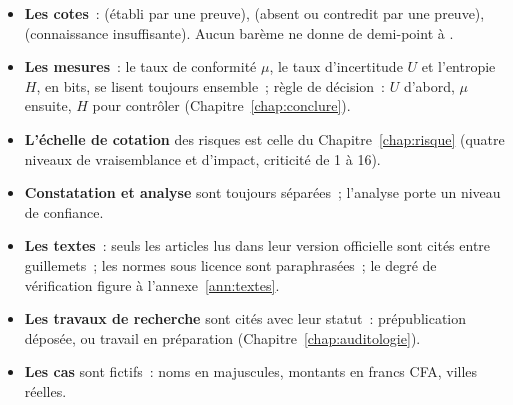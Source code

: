 \begin{itemize}
    \item \textbf{Les cotes}~: \OUI{} (établi par une preuve), \NON{}
          (absent ou contredit par une preuve), \NEK{} (connaissance
          insuffisante). Aucun barème ne donne de demi-point à \NEK{}.
    \item \textbf{Les mesures}~: le taux de conformité $\mu$, le taux
          d'incertitude $U$ et l'entropie $H$, en bits, se lisent toujours
          ensemble~; règle de décision~: $U$ d'abord, $\mu$ ensuite, $H$ pour
          contrôler (Chapitre~\ref{chap:conclure}).
    \item \textbf{L'échelle de cotation} des risques est celle du
          Chapitre~\ref{chap:risque} (quatre niveaux de vraisemblance et
          d'impact, criticité de 1 à 16).
    \item \textbf{Constatation et analyse} sont toujours séparées~; l'analyse
          porte un niveau de confiance.
    \item \textbf{Les textes}~: seuls les articles lus dans leur version
          officielle sont cités entre guillemets~; les normes sous licence
          sont paraphrasées~; le degré de vérification figure à
          l'annexe~\ref{ann:textes}.
    \item \textbf{Les travaux de recherche} sont cités avec leur statut~:
          prépublication déposée, ou travail en préparation
          (Chapitre~\ref{chap:auditologie}).
    \item \textbf{Les cas} sont fictifs~: noms en majuscules, montants en
          francs CFA, villes réelles.
\end{itemize}
